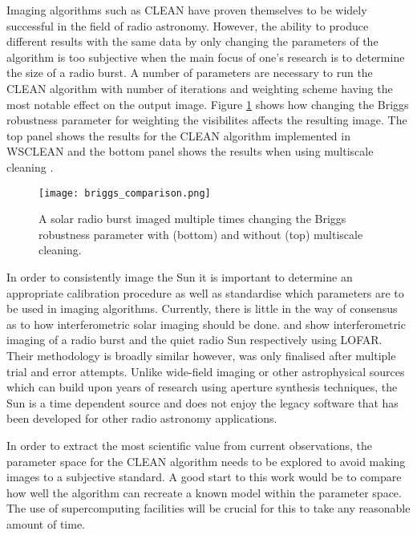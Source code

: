 Imaging algorithms such as CLEAN have proven themselves to be widely successful in the field of radio astronomy. However, the ability to produce different results with the same data by only changing the parameters of the algorithm is too subjective when the main focus of one's research is to determine the size of a radio burst. A number of parameters are necessary to run the CLEAN algorithm with number of iterations and weighting scheme having the most notable effect on the output image. Figure \ref{fig:briggs_comparison} shows how changing the Briggs robustness parameter for weighting the visibilites \citep{Briggs1995} affects the resulting image. The top panel shows the results for the CLEAN algorithm implemented in WSCLEAN and the bottom panel shows the results when using multiscale cleaning \citep{Offringa2017}. 

\begin{figure}[ht]
\centering
\texttt{[image: briggs\_comparison.png]}
\caption[An example of the same solar radio burst imaged with different weighting parameters.]{A solar radio burst imaged multiple times changing the Briggs robustness parameter with (bottom) and without (top) multiscale cleaning.}
\label{fig:briggs_comparison}
\end{figure}

In order to consistently image the Sun it is important to determine an appropriate calibration procedure as well as standardise which parameters are to be used in imaging algorithms. Currently, there is little in the way of consensus as to how interferometric solar imaging should be done. \cite{Maguire2021} and \cite{Ryan2021} show interferometric imaging of a radio burst and the quiet radio Sun respectively using LOFAR. Their methodology is broadly similar however, was only finalised after multiple trial and error attempts. Unlike wide-field imaging or other astrophysical sources which can build upon years of research using aperture synthesis techniques, the Sun is a time dependent source and does not enjoy the legacy software that has been developed for other radio astronomy applications. 

In order to extract the most scientific value from current observations, the parameter space for the CLEAN algorithm needs to be explored to avoid making images to a subjective standard. A good start to this work would be to compare how well the algorithm can recreate a known model within the parameter space. The use of supercomputing facilities will be crucial for this to take any reasonable amount of time. 



